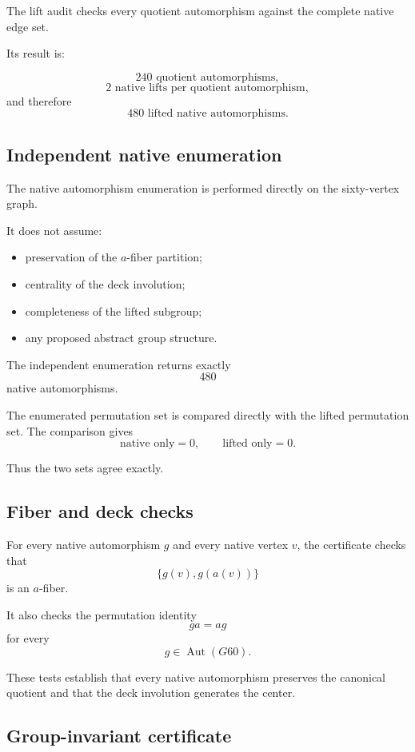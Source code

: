 The lift audit checks every quotient automorphism against the complete
native edge set.

Its result is:

\[
240\text{ quotient automorphisms},
\]
\[
2\text{ native lifts per quotient automorphism},
\]
and therefore
\[
480\text{ lifted native automorphisms}.
\]

\subsection{Independent native enumeration}

The native automorphism enumeration is performed directly on the
sixty-vertex graph.

It does not assume:

\begin{itemize}
\item preservation of the $a$-fiber partition;
\item centrality of the deck involution;
\item completeness of the lifted subgroup;
\item any proposed abstract group structure.
\end{itemize}

The independent enumeration returns exactly
\[
480
\]
native automorphisms.

The enumerated permutation set is compared directly with the lifted
permutation set. The comparison gives
\[
\text{native only}=0,
\qquad
\text{lifted only}=0.
\]

Thus the two sets agree exactly.

\subsection{Fiber and deck checks}

For every native automorphism $g$ and every native vertex $v$, the
certificate checks that
\[
\{g(v),g(a(v))\}
\]
is an $a$-fiber.

It also checks the permutation identity
\[
ga=ag
\]
for every
\[
g\in\operatorname{Aut}(G60).
\]

These tests establish that every native automorphism preserves the
canonical quotient and that the deck involution generates the center.

\subsection{Group-invariant certificate}


